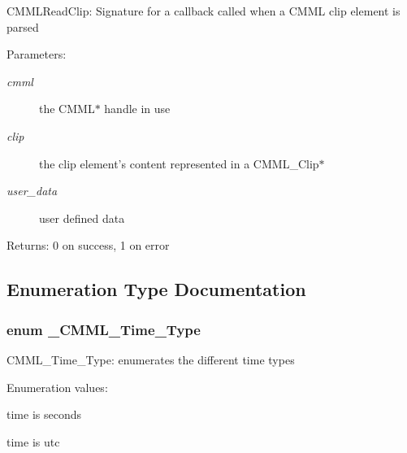 CMMLRead\-Clip: Signature for a callback called when a CMML clip element is parsed

\begin{Desc}
\item[Parameters:]
\begin{description}
\item[{\em cmml}]the CMML$\ast$ handle in use \item[{\em clip}]the clip element's content represented in a CMML\_\-Clip$\ast$ \item[{\em user\_\-data}]user defined data\end{description}
\end{Desc}
\begin{Desc}
\item[Returns:]0 on success, 1 on error \end{Desc}


\subsection{Enumeration Type Documentation}
\subsubsection{\setlength{\rightskip}{0pt plus 5cm}enum {\bf \_\-CMML\_\-Time\_\-Type}}\label{cmml_8h_a112}


CMML\_\-Time\_\-Type: enumerates the different time types \begin{Desc}
\item[Enumeration values: ]\par
\begin{description}
\item[{\em 
CMML\_\-SEC\_\-TIME\label{cmml_8h_a112a11}
}]time is seconds \item[{\em 
CMML\_\-UTC\_\-TIME\label{cmml_8h_a112a12}
}]time is utc \end{description}
\end{Desc}

